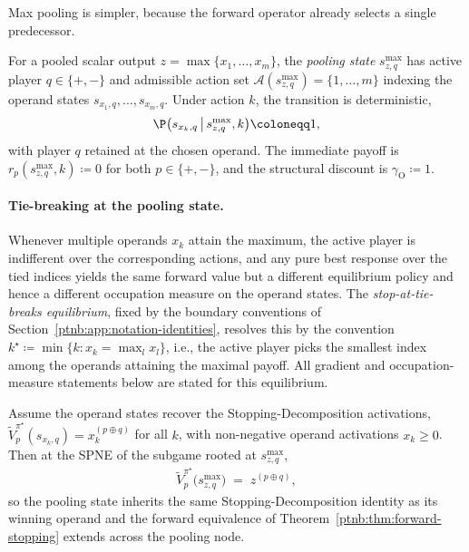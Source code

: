Max pooling is simpler, because the forward operator already selects a single predecessor.

\begin{definition}\label{ptnb:def:maxpool-subgame}
For a pooled scalar output $z = \max\{x_1, \dots, x_m\}$, the \emph{pooling state} $s_{z,q}^{\max}$
has active player $q \in \{+, -\}$ and admissible action set $\mathcal{A}(s_{z,q}^{\max}) = \{1,
    \dots, m\}$ indexing the operand states $s_{x_1,q}, \dots, s_{x_m,q}$. Under action $k$, the
transition is deterministic,
\begin{align}
    \P\bigl(s_{x_k,q} \,\big|\, s_{z,q}^{\max}, k\bigr) \coloneqq 1,
\end{align}
with player $q$ retained at the chosen operand. The immediate payoff is $r_p(s_{z,q}^{\max}, k)
    \coloneqq 0$ for both $p \in \{+,-\}$, and the structural discount is $\gamma_{\mathrm{O}}
    \coloneqq 1$.
\end{definition}

\paragraph{Tie-breaking at the pooling state.}
Whenever multiple operands $x_k$ attain the maximum, the active player is indifferent over the
corresponding actions, and any pure best response over the tied indices yields the same forward
value but a different equilibrium policy and hence a different occupation measure on the operand
states. The \emph{stop-at-tie-breaks equilibrium}, fixed by the boundary conventions of
Section~\ref{ptnb:app:notation-identities}, resolves this by the convention $k^\star \coloneqq \min\{k
    : x_k = \max_l x_l\}$, i.e., the active player picks the smallest index among the operands
attaining the maximal payoff. All gradient and occupation-measure statements below are stated for
this equilibrium.

\begin{proposition}\label{ptnb:prop:maxpool-equivalence}
Assume the operand states recover the Stopping-Decomposition activations, $\tilde
    V_p^{\pi^\star}(s_{x_k,q}) = x_k^{(p\oplus q)}$ for all $k$, with non-negative operand activations
$x_k \ge 0$. Then at the SPNE of the subgame rooted at $s_{z,q}^{\max}$,
\begin{align}
    \tilde V_p^{\pi^\star}\bigl(s_{z,q}^{\max}\bigr) \;=\; z^{(p\oplus q)},
\end{align}
so the pooling state inherits the same Stopping-Decomposition identity as its winning operand and
the forward equivalence of Theorem~\ref{ptnb:thm:forward-stopping} extends across the pooling node.
\end{proposition}

